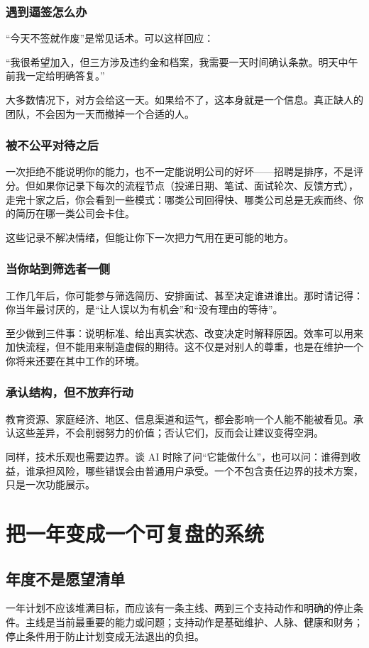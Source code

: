 \documentclass[UTF8,zihao=5,openany]{ctexbook}
\begin{document}
\subsection{遇到逼签怎么办}
“今天不签就作废”是常见话术。可以这样回应：

“我很希望加入，但三方涉及违约金和档案，我需要一天时间确认条款。明天中午前我一定给明确答复。”

大多数情况下，对方会给这一天。如果给不了，这本身就是一个信息。真正缺人的团队，不会因为一天而撤掉一个合适的人。

\subsection{被不公平对待之后}
一次拒绝不能说明你的能力，也不一定能说明公司的好坏——招聘是排序，不是评分。但如果你记录下每次的流程节点（投递日期、笔试、面试轮次、反馈方式），走完十家之后，你会看到一些模式：哪类公司回得快、哪类公司总是无疾而终、你的简历在哪一类公司会卡住。

这些记录不解决情绪，但能让你下一次把力气用在更可能的地方。

\subsection{当你站到筛选者一侧}
工作几年后，你可能参与筛选简历、安排面试、甚至决定谁进谁出。那时请记得：你当年最讨厌的，是“让人误以为有机会”和“没有理由的等待”。

至少做到三件事：说明标准、给出真实状态、改变决定时解释原因。效率可以用来加快流程，但不能用来制造虚假的期待。这不仅是对别人的尊重，也是在维护一个你将来还要在其中工作的环境。

\subsection{承认结构，但不放弃行动}
教育资源、家庭经济、地区、信息渠道和运气，都会影响一个人能不能被看见。承认这些差异，不会削弱努力的价值；否认它们，反而会让建议变得空洞。

同样，技术乐观也需要边界。谈 AI 时除了问“它能做什么”，也可以问：谁得到收益，谁承担风险，哪些错误会由普通用户承受。一个不包含责任边界的技术方案，只是一次功能展示。


\chapter{把一年变成一个可复盘的系统}
\section{年度不是愿望清单}
一年计划不应该堆满目标，而应该有一条主线、两到三个支持动作和明确的停止条件。主线是当前最重要的能力或问题；支持动作是基础维护、人脉、健康和财务；停止条件用于防止计划变成无法退出的负担。
\end{document}
